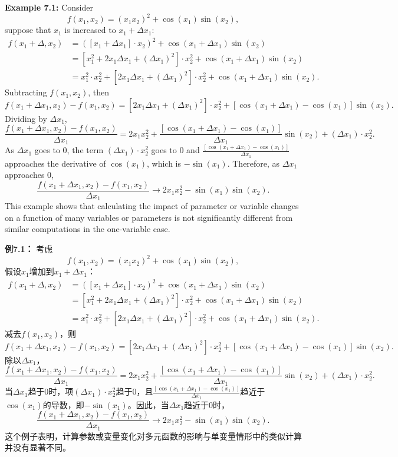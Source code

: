 \begin{original}
\textbf{Example 7.1:} Consider
\[
f(x_1, x_2) = (x_1 x_2)^2 + \cos(x_1) \sin(x_2),
\]
suppose that $x_1$ is increased to $x_1 + \Delta x_1$:
\begin{align*}
f(x_1 + \Delta, x_2) &= ([x_1 + \Delta x_1] \cdot x_2)^2 + \cos(x_1 + \Delta x_1) \sin(x_2)\\
&= [x_1^2 + 2 x_1 \Delta x_1 + (\Delta x_1)^2] \cdot x_2^2 + \cos(x_1 + \Delta x_1) \sin(x_2)\\
&= x_1^2 \cdot x_2^2 + [2 x_1 \Delta x_1 + (\Delta x_1)^2] \cdot x_2^2 + \cos(x_1 + \Delta x_1) \sin(x_2).
\end{align*}
Subtracting $f(x_1, x_2)$, then
\[
f(x_1 + \Delta x_1, x_2) - f(x_1, x_2) = [2 x_1 \Delta x_1 + (\Delta x_1)^2] \cdot x_2^2 + [\cos(x_1 + \Delta x_1) - \cos(x_1)] \sin(x_2).
\]
Dividing by $\Delta x_1$,
\[
\frac{f(x_1 + \Delta x_1, x_2) - f(x_1, x_2)}{\Delta x_1} = 2 x_1 x_2^2 + \frac{[\cos(x_1 + \Delta x_1) - \cos(x_1)]}{\Delta x_1} \sin(x_2) + (\Delta x_1) \cdot x_2^2.
\]
As $\Delta x_1$ goes to 0, the term $(\Delta x_1) \cdot x_2^2$ goes to 0 and $\frac{[\cos(x_1 + \Delta x_1) - \cos(x_1)]}{\Delta x_1}$ approaches the derivative of $\cos(x_1)$, which is $-\sin(x_1)$. Therefore, as $\Delta x_1$ approaches 0,
\[
\frac{f(x_1 + \Delta x_1, x_2) - f(x_1, x_2)}{\Delta x_1} \to 2 x_1 x_2^2 - \sin(x_1) \sin(x_2).
\]
This example shows that calculating the impact of parameter or variable changes on a function of many variables or parameters is not significantly different from similar computations in the one-variable case.
\end{original}
\begin{translation}
\textbf{例7.1：} 考虑
\[
f(x_1, x_2) = (x_1 x_2)^2 + \cos(x_1) \sin(x_2),
\]
假设$x_1$增加到$x_1 + \Delta x_1$：
\begin{align*}
f(x_1 + \Delta, x_2) &= ([x_1 + \Delta x_1] \cdot x_2)^2 + \cos(x_1 + \Delta x_1) \sin(x_2)\\
&= [x_1^2 + 2 x_1 \Delta x_1 + (\Delta x_1)^2] \cdot x_2^2 + \cos(x_1 + \Delta x_1) \sin(x_2)\\
&= x_1^2 \cdot x_2^2 + [2 x_1 \Delta x_1 + (\Delta x_1)^2] \cdot x_2^2 + \cos(x_1 + \Delta x_1) \sin(x_2).
\end{align*}
减去$f(x_1, x_2)$，则
\[
f(x_1 + \Delta x_1, x_2) - f(x_1, x_2) = [2 x_1 \Delta x_1 + (\Delta x_1)^2] \cdot x_2^2 + [\cos(x_1 + \Delta x_1) - \cos(x_1)] \sin(x_2).
\]
除以$\Delta x_1$，
\[
\frac{f(x_1 + \Delta x_1, x_2) - f(x_1, x_2)}{\Delta x_1} = 2 x_1 x_2^2 + \frac{[\cos(x_1 + \Delta x_1) - \cos(x_1)]}{\Delta x_1} \sin(x_2) + (\Delta x_1) \cdot x_2^2.
\]
当$\Delta x_1$趋于0时，项$(\Delta x_1) \cdot x_2^2$趋于0，且$\frac{[\cos(x_1 + \Delta x_1) - \cos(x_1)]}{\Delta x_1}$趋近于$\cos(x_1)$的导数，即$-\sin(x_1)$。因此，当$\Delta x_1$趋近于0时，
\[
\frac{f(x_1 + \Delta x_1, x_2) - f(x_1, x_2)}{\Delta x_1} \to 2 x_1 x_2^2 - \sin(x_1) \sin(x_2).
\]
这个例子表明，计算参数或变量变化对多元函数的影响与单变量情形中的类似计算并没有显著不同。
\end{translation}

